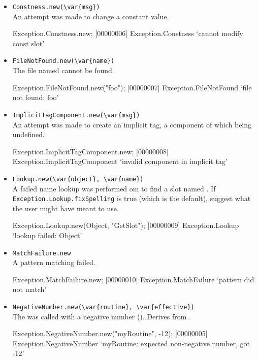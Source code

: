 \begin{itemize}
\item \lstinline|Constness.new(\var{msg})|\\
  An attempt was made to change a constant value.
\begin{urbiscript}
Exception.Constness.new;
[00000006] Exception.Constness `cannot modify const slot'
\end{urbiscript}

\item \lstinline|FileNotFound.new(\var{name})|\\
  The file named  cannot be found.
\begin{urbiscript}
Exception.FileNotFound.new("foo");
[00000007] Exception.FileNotFound `file not found: foo'
\end{urbiscript}

\item \lstinline|ImplicitTagComponent.new(\var{msg})|\\
  An attempt was made to create an implicit tag, a component of which
  being undefined.
\begin{urbiscript}
Exception.ImplicitTagComponent.new;
[00000008] Exception.ImplicitTagComponent `invalid component in implicit tag'
\end{urbiscript}

\item \lstinline|Lookup.new(\var{object}, \var{name})|\\
  A failed name lookup was performed om  to find a slot
  named .  If \lstinline|Exception.Lookup.fixSpelling| is
  true (which is the default), suggest what the user might have meant
  to use.
\begin{urbiscript}
Exception.Lookup.new(Object, "GetSlot");
[00000009] Exception.Lookup `lookup failed: Object'
\end{urbiscript}

\item \lstinline|MatchFailure.new|\\
  A pattern matching failed.
\begin{urbiscript}
Exception.MatchFailure.new;
[00000010] Exception.MatchFailure `pattern did not match'
\end{urbiscript}

\item \lstinline|NegativeNumber.new(\var{routine}, \var{effective})|\\
  The  was called with a negative number
  ().  Derives from .
\begin{urbiscript}
Exception.NegativeNumber.new("myRoutine", -12);
[00000005] Exception.NegativeNumber `myRoutine: expected non-negative number, got -12'
\end{urbiscript}


\end{itemize}
